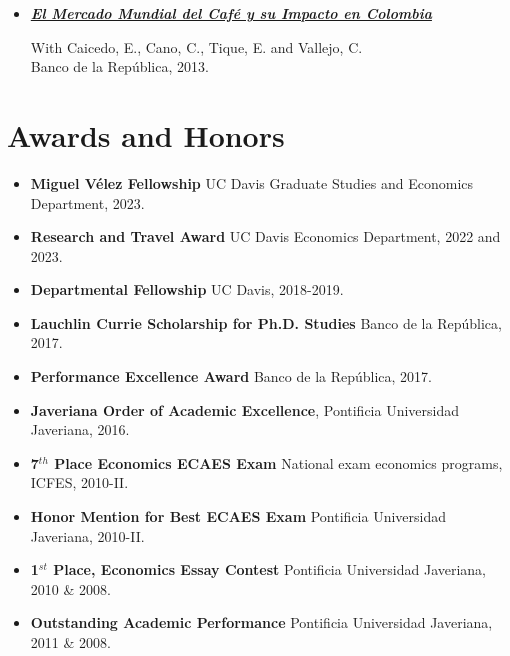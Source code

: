 \documentclass{res}
\begin{document}
\begin{normalsize}
\begin{itemize}
\begin{small}
\end{small}
\item \href{http://www.banrep.gov.co/es/libro-flujos-capitales}{\textbf{\textit{El Mercado Mundial del Caf\'{e} y su Impacto en Colombia}}}\\ 
\begin{small}
With Caicedo, E., Cano, C., Tique, E. and Vallejo, C.\\ Banco de la Rep\'{u}blica, 2013.
\end{small}
\end{itemize}


\section{\textbf{Awards and Honors}}
\begin{itemize}
\item \textbf{Miguel V\'{e}lez Fellowship} UC Davis Graduate Studies and Economics Department, 2023.
\item \textbf{Research and Travel Award} UC Davis Economics Department, 2022 and 2023.
\item \textbf{Departmental Fellowship} UC Davis, 2018-2019.
\item \textbf{Lauchlin Currie Scholarship for Ph.D. Studies} Banco de la Rep\'{u}blica, 2017.
\item \textbf{Performance Excellence Award} Banco de la Rep\'{u}blica, 2017.
\item \textbf{Javeriana Order of Academic Excellence}, Pontificia  Universidad Javeriana, 2016.
\item \textbf{7$^{th}$ Place Economics ECAES Exam} National exam economics programs, ICFES, 2010-II.
\item \textbf{Honor Mention for Best ECAES Exam} Pontificia Universidad Javeriana, 2010-II.
\item \textbf{1$^{st}$ Place, Economics Essay Contest} Pontificia Universidad Javeriana, 2010 \& 2008.
\item \textbf{Outstanding Academic Performance} Pontificia Universidad Javeriana, 2011 \& 2008.
\end{itemize}


\end{normalsize}
\end{document}
